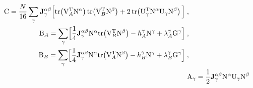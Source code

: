 \begin{align}
\begin{split}
    \mathrm{C}&= \frac{N}{16} \sum_{\gamma }   \mathbf{J}_{\gamma}^{\alpha\beta} \Big[
      \mathrm{tr}\!\left( \mathrm{V}_{A}^{\mathrm{T}} \mathrm{N}^\alpha \right)\mathrm{tr}\!\left( \mathrm{V}_{B}^{\mathrm{T}} \mathrm{N}^\beta \right)
    + 2 \,  \mathrm{tr}\!\left( \mathrm{U}_{\gamma}^{\mathrm{T}} \mathrm{N}^\alpha   \mathrm{U}_{\gamma} \mathrm{N}^\beta \right)   \Big]
    \; ,
\end{split}    \\
\begin{split}
    \mathrm{B}_{A}&= \sum_{\gamma}\!\Big[ \frac{1}{4} \mathbf{J}_{\gamma}^{\alpha\beta}
    \mathrm{N}^\alpha \mathrm{tr}\!\left( \mathrm{V}_{B}^{\mathrm{T}} \mathrm{N}^\beta \right) -    h_{A}^\gamma  \mathrm{N}^\gamma  + \lambda_{A}^\gamma  \mathrm{G}^\gamma \Big]
    \; ,
\end{split} \\
\begin{split}
    \mathrm{B}_{B}&= \sum_{\gamma}\!\Big[  \frac{1}{4}  \mathbf{J}_{\gamma}^{\alpha\beta}
    \mathrm{N}^\alpha \mathrm{tr}\!\left( \mathrm{V}_{A}^{\mathrm{T}} \mathrm{N}^\beta \right) -    h_{B}^\gamma  \mathrm{N}^\gamma  + \lambda_{B}^\gamma  \mathrm{G}^\gamma \Big]
    \; ,
\end{split} \\
\mathrm{A}_{\gamma} &= \frac{1}{2}\mathbf{J}_{\gamma}^{\alpha\beta}   \mathrm{N}^\alpha \mathrm{U}_{\gamma} \mathrm{N}^\beta
\end{align}

